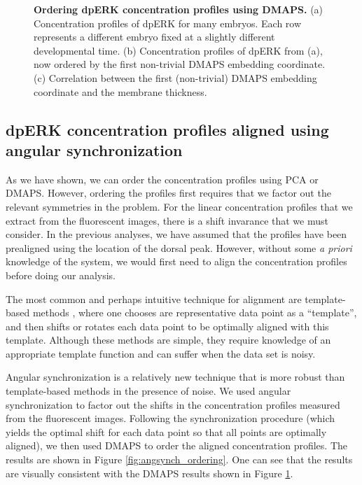 \documentclass[10pt]{article}
\begin{document}
\begin{figure}[H]
\begin{subfigure}{0.3\textwidth}
\caption{}
\end{subfigure}
\caption{{\bf Ordering dpERK concentration profiles using DMAPS.} (a) Concentration profiles of dpERK for many embryos. Each row represents a different embryo fixed at a slightly different developmental time.
(b) Concentration profiles of dpERK from (a), now ordered by the first non-trivial DMAPS embedding coordinate.
(c) Correlation between the first (non-trivial) DMAPS embedding coordinate and the membrane thickness.}
\label{fig:DMAPS_ordering}
\end{figure}

\subsection*{dpERK concentration profiles aligned using angular synchronization}

As we have shown, we can order the concentration profiles using PCA or DMAPS.
%
However, ordering the profiles first requires that we factor out the relevant symmetries in the problem.
%
For the linear concentration profiles that we extract from the fluorescent images, there is a shift invarance that we must consider.
%
In the previous analyses, we have assumed that the profiles have been prealigned using the location of the dorsal peak.
%
However, without some {\em a priori} knowledge of the system, we would first need to align the concentration profiles before doing our analysis.

The most common and perhaps intuitive technique for alignment are template-based methods \cite{...}, where one chooses are representative data point as a ``template'', and then shifts or rotates each data point to be optimally aligned with this template.
%
Although these methods are simple, they require knowledge of an appropriate template function and can suffer when the data set is noisy.

Angular synchronization \cite{...} is a relatively new technique that is more robust than template-based methods in the presence of noise.
%
We used angular synchronization to factor out the shifts in the concentration profiles measured from the fluorescent images.
%
Following the synchronization procedure (which yields the optimal shift for each data point so that all points are optimally aligned), we then used DMAPS to order the aligned concentration profiles.
%
The results are shown in Figure \ref{fig:angsynch_ordering}.
%
One can see that the results are visually consistent with the DMAPS results shown in Figure \ref{fig:DMAPS_ordering}. 
\end{document}
